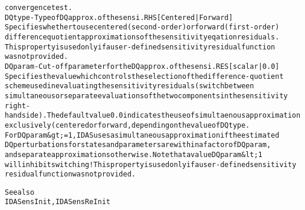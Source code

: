 \begin{alltt}
   convergence test.
DQtype - Type of DQ approx. of the sensi. RHS [{Centered} | Forward ]
   Specifies whether to use centered (second-order) or forward (first-order)
   difference quotient approximations of the sensitivity eqation residuals.
   This property is used only if a user-defined sensitivity residual function
   was not provided.
DQparam - Cut-off parameter for the DQ approx. of the sensi. RES [ scalar | {0.0} ]
   Specifies the value which controls the selection of the difference-quotient
   scheme used in evaluating the sensitivity residuals (switch between
   simultaneous or separate evaluations of the two components in the sensitivity
   right-hand side). The default value 0.0 indicates the use of simultaenous approximation
   exclusively (centered or forward, depending on the value of DQtype.
   For DQparam &gt;= 1, IDAS uses a simultaneous approximation if the estimated
   DQ perturbations for states and parameters are within a factor of DQparam,
   and separate approximations otherwise. Note that a value DQparam &lt; 1
   will inhibit switching! This property is used only if a user-defined sensitivity
   residual function was not provided.

   See also
        IDASensInit, IDASensReInit
\end{alltt}






\vspace{0.1in}